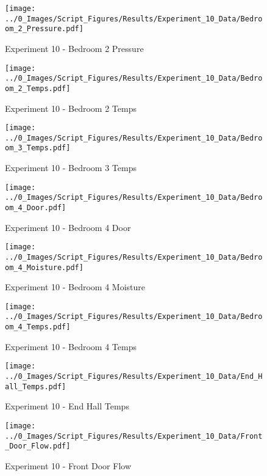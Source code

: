 	\clearpage

	\begin{figure}[H]
		\centering
		\texttt{[image: ../0\_Images/Script\_Figures/Results/Experiment\_10\_Data/Bedroom\_2\_Pressure.pdf]}
		\caption[]{Experiment 10 - Bedroom 2 Pressure}
	\end{figure}
 

	\begin{figure}[H]
		\centering
		\texttt{[image: ../0\_Images/Script\_Figures/Results/Experiment\_10\_Data/Bedroom\_2\_Temps.pdf]}
		\caption[]{Experiment 10 - Bedroom 2 Temps}
	\end{figure}
 
	\clearpage

	\begin{figure}[H]
		\centering
		\texttt{[image: ../0\_Images/Script\_Figures/Results/Experiment\_10\_Data/Bedroom\_3\_Temps.pdf]}
		\caption[]{Experiment 10 - Bedroom 3 Temps}
	\end{figure}
 

	\begin{figure}[H]
		\centering
		\texttt{[image: ../0\_Images/Script\_Figures/Results/Experiment\_10\_Data/Bedroom\_4\_Door.pdf]}
		\caption[]{Experiment 10 - Bedroom 4 Door}
	\end{figure}
 
	\clearpage

	\begin{figure}[H]
		\centering
		\texttt{[image: ../0\_Images/Script\_Figures/Results/Experiment\_10\_Data/Bedroom\_4\_Moisture.pdf]}
		\caption[]{Experiment 10 - Bedroom 4 Moisture}
	\end{figure}
 

	\begin{figure}[H]
		\centering
		\texttt{[image: ../0\_Images/Script\_Figures/Results/Experiment\_10\_Data/Bedroom\_4\_Temps.pdf]}
		\caption[]{Experiment 10 - Bedroom 4 Temps}
	\end{figure}
 
	\clearpage

	\begin{figure}[H]
		\centering
		\texttt{[image: ../0\_Images/Script\_Figures/Results/Experiment\_10\_Data/End\_Hall\_Temps.pdf]}
		\caption[]{Experiment 10 - End Hall Temps}
	\end{figure}
 

	\begin{figure}[H]
		\centering
		\texttt{[image: ../0\_Images/Script\_Figures/Results/Experiment\_10\_Data/Front\_Door\_Flow.pdf]}
		\caption[]{Experiment 10 - Front Door Flow}
	\end{figure}
 
